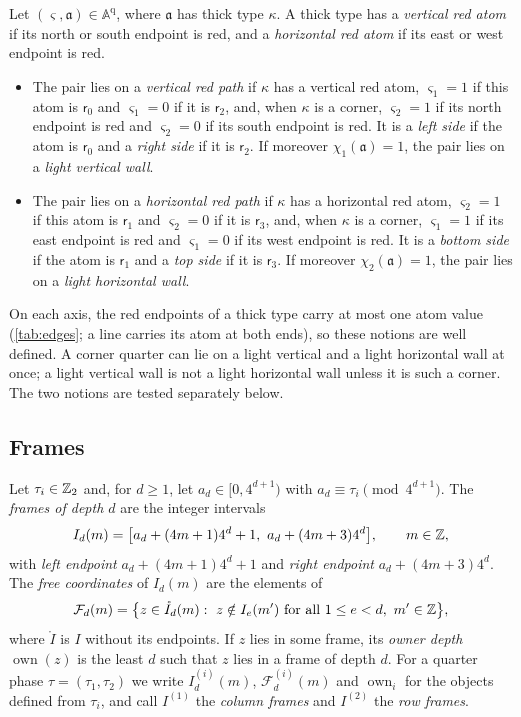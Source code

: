 \begin{definition}[Walls]\label{scf:def-walls}
Let $(\varsigma,\mathfrak a)\in\mathbb A^{\mathrm q}$, where $\mathfrak a$ has thick type $\kappa$. A thick type has a \emph{vertical red atom} if its north or south endpoint is red, and a \emph{horizontal red atom} if its east or west endpoint is red.
\begin{itemize}
\item The pair lies on a \emph{vertical red path} if $\kappa$ has a vertical red atom, $\varsigma_1=1$ if this atom is $\mathsf r_0$ and $\varsigma_1=0$ if it is $\mathsf r_2$, and, when $\kappa$ is a corner, $\varsigma_2=1$ if its north endpoint is red and $\varsigma_2=0$ if its south endpoint is red. It is a \emph{left side} if the atom is $\mathsf r_0$ and a \emph{right side} if it is $\mathsf r_2$. If moreover $\chi_1(\mathfrak a)=1$, the pair lies on a \emph{light vertical wall}.
\item The pair lies on a \emph{horizontal red path} if $\kappa$ has a horizontal red atom, $\varsigma_2=1$ if this atom is $\mathsf r_1$ and $\varsigma_2=0$ if it is $\mathsf r_3$, and, when $\kappa$ is a corner, $\varsigma_1=1$ if its east endpoint is red and $\varsigma_1=0$ if its west endpoint is red. It is a \emph{bottom side} if the atom is $\mathsf r_1$ and a \emph{top side} if it is $\mathsf r_3$. If moreover $\chi_2(\mathfrak a)=1$, the pair lies on a \emph{light horizontal wall}.
\end{itemize}
\end{definition}

On each axis, the red endpoints of a thick type carry at most one atom value (\cref{tab:edges}; a line carries its atom at both ends), so these notions are well defined. A corner quarter can lie on a light vertical and a light horizontal wall at once; a light vertical wall is not a light horizontal wall unless it is such a corner. The two notions are tested separately below.

\subsection{Frames}\label{scf:sub-frames}

\begin{definition}\label{scf:def-frames}
Let $\tau_i\in\mathbb{Z}_2$ and, for $d\ge1$, let $a_d\in[0,4^{d+1})$ with $a_d\equiv\tau_i\pmod{4^{d+1}}$. The \emph{frames of depth $d$} are the integer intervals
\[
I_d(m)=\bigl[a_d+(4m+1)4^d+1,\ a_d+(4m+3)4^d\bigr],\qquad m\in\Z,
\]
with \emph{left endpoint} $a_d+(4m+1)4^d+1$ and \emph{right endpoint} $a_d+(4m+3)4^d$. The \emph{free coordinates} of $I_d(m)$ are the elements of
\[
\mathcal F_d(m)=\bigl\{z\in\mathring I_d(m):\ z\notin I_e(m')\text{ for all }1\le e<d,\ m'\in\mathbb{Z}\bigr\},
\]
where $\mathring I$ is $I$ without its endpoints. If $z$ lies in some frame, its \emph{owner depth} $\operatorname{own}(z)$ is the least $d$ such that $z$ lies in a frame of depth $d$. For a quarter phase $\tau=(\tau_1,\tau_2)$ we write $I^{(i)}_d(m)$, $\mathcal F^{(i)}_d(m)$ and $\operatorname{own}_i$ for the objects defined from $\tau_i$, and call $I^{(1)}$ the \emph{column frames} and $I^{(2)}$ the \emph{row frames}.
\end{definition}

